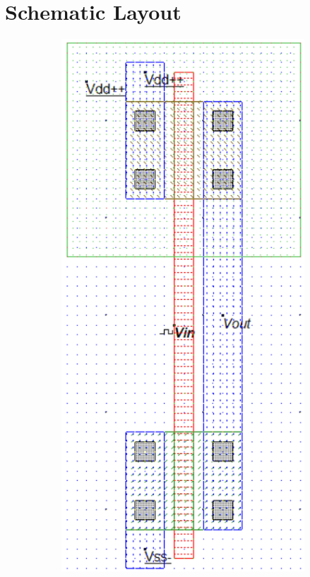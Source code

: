 \documentclass[a4paper,12pt]{article}
\begin{document}
\section{Schematic Layout }
\begin{figure}[H]
	\centering

\begin{subfigure}[t]{0.49\textwidth}
	\centering

		\includegraphics[width=.9\linewidth, height=.7\textheight]{images/c/ci1}


\end{subfigure}
\end{figure}
\end{document}
